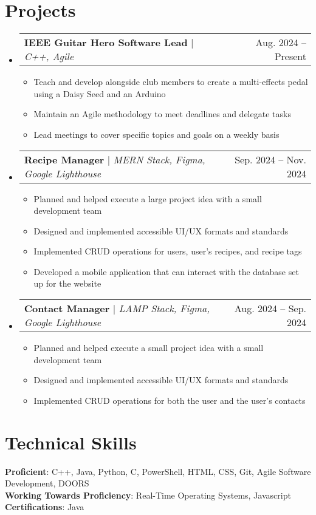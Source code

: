\documentclass[letterpaper,11pt]{article}
\makeatletter
\newcommand{\resumeItem}[1]{
  \item\small{
    {#1 \vspace{-2pt}}
  }
}
\newcommand{\resumeProjectHeading}[2]{
    \item
    \begin{tabular*}{0.97\textwidth}{l@{\extracolsep{\fill}}r}
      \small#1 & #2 \\
    \end{tabular*}\vspace{-7pt}
}
\newcommand{\resumeSubHeadingListStart}{\begin{itemize}[leftmargin=0.15in, label={}]}
\newcommand{\resumeSubHeadingListEnd}{\end{itemize}}
\newcommand{\resumeItemListStart}{\begin{itemize}}
\newcommand{\resumeItemListEnd}{\end{itemize}\vspace{-5pt}}
\makeatother
\begin{document}
\section{Projects}
    \resumeSubHeadingListStart
      \resumeProjectHeading
          {\textbf{IEEE Guitar Hero Software Lead} $|$ \emph{C++, Agile}}{Aug. 2024 -- Present}
          \resumeItemListStart
            \resumeItem{Teach and develop alongside club members to create a multi-effects pedal using a Daisy Seed and an Arduino}
            \resumeItem{Maintain an Agile methodology to meet deadlines and delegate tasks}
            \resumeItem{Lead meetings to cover specific topics and goals on a weekly basis}
          \resumeItemListEnd
      \resumeProjectHeading
          {\textbf{Recipe Manager} $|$ \emph{MERN Stack, Figma, Google Lighthouse}}{Sep. 2024 -- Nov. 2024}
          \resumeItemListStart
            \resumeItem{Planned and helped execute a large project idea with a small development team}
            \resumeItem{Designed and implemented accessible UI/UX formats and standards}
            \resumeItem{Implemented CRUD operations for users, user's recipes, and recipe tags}
            \resumeItem{Developed a mobile application that can interact with the database set up for the website}
          \resumeItemListEnd
      \resumeProjectHeading
          {\textbf{Contact Manager} $|$ \emph{LAMP Stack, Figma, Google Lighthouse}}{Aug. 2024 -- Sep. 2024}
          \resumeItemListStart
            \resumeItem{Planned and helped execute a small project idea with a small development team}
            \resumeItem{Designed and implemented accessible UI/UX formats and standards}
            \resumeItem{Implemented CRUD operations for both the user and the user's contacts}
          \resumeItemListEnd
    \resumeSubHeadingListEnd

\section{Technical Skills}
 \begin{itemize}[leftmargin=0.15in, label={}]
    \small{\item{
     \textbf{Proficient}{: C++, Java, Python, C, PowerShell, HTML, CSS, Git, Agile Software Development, DOORS} \\
     \textbf{Working Towards Proficiency}{: Real-Time Operating Systems, Javascript} \\
     \textbf{Certifications}{: Java}
    }}
 \end{itemize}

\end{document}
